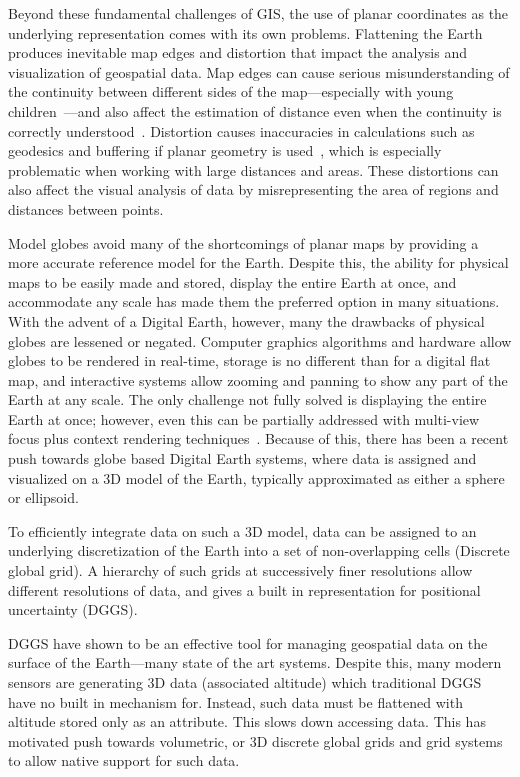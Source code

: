 Beyond these fundamental challenges of GIS, the use of planar coordinates as the underlying representation comes with its own problems. %
Flattening the Earth produces inevitable map edges and distortion that impact the analysis and visualization of geospatial data.
Map edges can cause serious misunderstanding of the continuity between different sides of the map---especially with young children~\cite{hennerdal2015beyond}---and also affect the estimation of distance even when the continuity is correctly understood~\cite{hruby20182000}.
Distortion causes inaccuracies in calculations such as geodesics and buffering if planar geometry is used~\cite{flaterbuffering}, which is especially problematic when working with large distances and areas.
These distortions can also affect the visual analysis of data by misrepresenting the area of regions and distances between points. 

Model globes avoid many of the shortcomings of planar maps by providing a more accurate reference model for the Earth.
Despite this, the ability for physical maps to be easily made and stored, display the entire Earth at once, and accommodate any scale has made them the preferred option in many situations. 
With the advent of a Digital Earth, however, many the drawbacks of physical globes are lessened or negated.
Computer graphics algorithms and hardware allow globes to be rendered in real-time, storage is no different than for a digital flat map, and interactive systems allow zooming and panning to show any part of the Earth at any scale.
The only challenge not fully solved is displaying the entire Earth at once; however, even this can be partially addressed with multi-view focus plus context rendering techniques~\cite{mark-sherlock}.
Because of this, there has been a recent push towards globe based Digital Earth systems, where data is assigned and visualized on a 3D model of the Earth, typically approximated as either a sphere or ellipsoid. 


To efficiently integrate data on such a 3D model, data can be assigned to an underlying discretization of the Earth into a set of non-overlapping cells (Discrete global grid). A hierarchy of such grids at successively finer resolutions allow different resolutions of data, and gives a built in representation for positional uncertainty (DGGS). 

DGGS have shown to be an effective tool for managing geospatial data on the surface of the Earth---many state of the art systems. Despite this, many modern sensors are generating 3D data (associated altitude) which traditional DGGS have no built in mechanism for. Instead, such data must be flattened with altitude stored only as an attribute. This slows down accessing data. This has motivated push towards volumetric, or 3D discrete global grids and grid systems to allow native support for such data.

